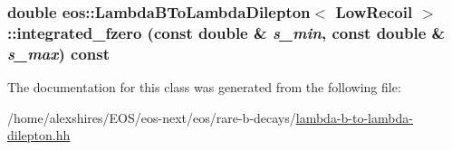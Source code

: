 \label{classeos_1_1LambdaBToLambdaDilepton_3_01LowRecoil_01_4_a70e787fa5e6a92c323644b5f0a11206f}
\hypertarget{classeos_1_1LambdaBToLambdaDilepton_3_01LowRecoil_01_4_ad5cbe369b4f7131dec8928628222e37d}{
\subsubsection[{integrated\_\-fzero}]{\setlength{\rightskip}{0pt plus 5cm}double eos::LambdaBToLambdaDilepton$<$ {\bf LowRecoil} $>$::integrated\_\-fzero (const double \& {\em s\_\-min}, \/  const double \& {\em s\_\-max}) const}}
\label{classeos_1_1LambdaBToLambdaDilepton_3_01LowRecoil_01_4_ad5cbe369b4f7131dec8928628222e37d}


The documentation for this class was generated from the following file:\begin{DoxyCompactItemize}
\item 
/home/alexshires/EOS/eos-\/next/eos/rare-\/b-\/decays/\hyperlink{lambda-b-to-lambda-dilepton_8hh}{lambda-\/b-\/to-\/lambda-\/dilepton.hh}\end{DoxyCompactItemize}
